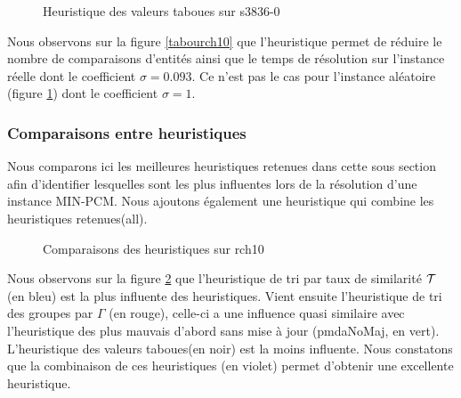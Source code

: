 \begin{figure}
\centering
	\begin{minipage}[c]{0.49\linewidth}
	\centering
	
	\end{minipage}
	\begin{minipage}[c]{0.49\linewidth}
	\centering
	
	\end{minipage}
\caption{Heuristique des valeurs taboues sur s3836-0}
\label{tabou3836}
\end{figure}

Nous observons sur la figure \ref{tabourch10} que l'heuristique permet de réduire le nombre de comparaisons d'entités ainsi que le temps de résolution sur l'instance réelle dont le coefficient $\sigma = 0.093$. Ce n'est pas le cas pour l'instance aléatoire (figure \ref{tabou3836}) dont le coefficient $\sigma = 1$.

\subsubsection{Comparaisons entre heuristiques}
\label{sectCompar}

Nous comparons ici les meilleures heuristiques retenues dans cette sous section afin d'identifier lesquelles sont les plus influentes lors de la résolution d'une instance MIN-PCM. Nous ajoutons également une heuristique qui combine les heuristiques retenues(all).

\begin{figure}
\centering
	\begin{minipage}[c]{0.49\linewidth}
	\centering
	
	\end{minipage}
	\begin{minipage}[c]{0.49\linewidth}
	\centering
	
	\end{minipage}
\caption{Comparaisons des heuristiques sur rch10}
\label{compareRch10}
\end{figure}

Nous observons sur la figure \ref{compareRch10} que l'heuristique de tri par taux de similarité $\cal{T}$ (en bleu) est la plus influente des heuristiques. Vient ensuite l'heuristique de tri des groupes par $\Gamma$ (en rouge), celle-ci a une influence quasi similaire avec l'heuristique des plus mauvais d'abord sans mise à jour (pmdaNoMaj, en vert). L'heuristique des valeurs taboues(en noir) est la moins influente. Nous constatons que la combinaison de ces heuristiques (en violet) permet d'obtenir une excellente heuristique.

